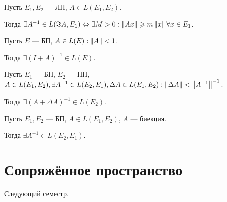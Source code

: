 \begin{thm}[6.1]
Пусть $E_1, E_2$ --- ЛП, $A \in L(E_1, E_2)$. 

Тогда $\exists A^{-1} \in L(\Im A, E_1) \Leftrightarrow \exists M>0: \left\lVert Ax\right\rVert \geqslant m \left\lVert x\right\rVert \forall x \in E_1$.
\end{thm}

\begin{thm}[6.2]
Пусть $E$ --- БП, $A \in L(E): \left\lVert A\right\rVert < 1$. 

Тогда $\exists (I+A)^{-1} \in L(E)$.
\end{thm}

\begin{thm}[6.3]
Пусть $E_1$ --- БП, $E_2$ --- НП, $A \in L(E_1, E_2), \exists A^{-1} \in L(E_2, E_1), \Delta A \in L(E_1, E_2): \left\lVert\Delta A\right\rVert < \left\lVert A^{-1}\right\rVert^{-1}$.

Тогда $\exists (A+\Delta A)^{-1} \in L(E_2)$.
\end{thm}

\begin{thm}
Пусть $E_1, E_2$ --- БП, $A \in L(E_1, E_2)$, $A$ --- биекция.

Тогда $\exists A^{-1} \in L(E_2, E_1)$.
\end{thm}

\section{Сопряжённое пространство}
Следующий семестр.



